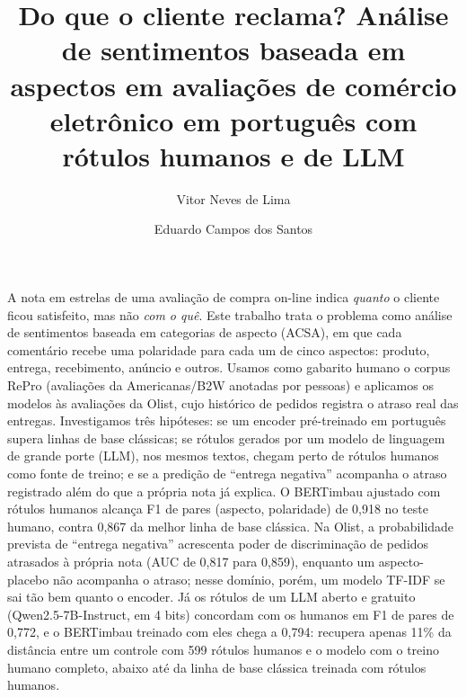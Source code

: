 \documentclass[a4paper, twocolumn, 11pt, twoside]{article}
\title{Do que o cliente reclama? Análise de sentimentos baseada em aspectos em avaliações de comércio eletrônico em português com rótulos humanos e de LLM}
\author{
  Vitor Neves de Lima
  \instituto{Ibmec BH}
  \email{vineveslima11@gmail.com}
  \and
  Eduardo Campos dos Santos \meuorcid{0000-0001-7361-3009}
  \instituto{Ibmec BH}
  \email{edu.campos.santos@gmail.com}
}
\begin{document}
\maketitle

\begin{resumo}
A nota em estrelas de uma avaliação de compra on-line indica \emph{quanto} o cliente ficou satisfeito, mas não \emph{com o quê}. Este trabalho trata o problema como análise de sentimentos baseada em categorias de aspecto (ACSA), em que cada comentário recebe uma polaridade para cada um de cinco aspectos: produto, entrega, recebimento, anúncio e outros. Usamos como gabarito humano o corpus RePro (avaliações da Americanas/B2W anotadas por pessoas) e aplicamos os modelos às avaliações da Olist, cujo histórico de pedidos registra o atraso real das entregas. Investigamos três hipóteses: se um encoder pré-treinado em português supera linhas de base clássicas; se rótulos gerados por um modelo de linguagem de grande porte (LLM), nos mesmos textos, chegam perto de rótulos humanos como fonte de treino; e se a predição de ``entrega negativa'' acompanha o atraso registrado além do que a própria nota já explica. O BERTimbau ajustado com rótulos humanos alcança F1 de pares (aspecto, polaridade) de 0,918 no teste humano, contra 0,867 da melhor linha de base clássica. Na Olist, a probabilidade prevista de ``entrega negativa'' acrescenta poder de discriminação de pedidos atrasados à própria nota (AUC de 0,817 para 0,859), enquanto um aspecto-placebo não acompanha o atraso; nesse domínio, porém, um modelo TF-IDF se sai tão bem quanto o encoder. Já os rótulos de um LLM aberto e gratuito (Qwen2.5-7B-Instruct, em 4 bits) concordam com os humanos em F1 de pares de 0,772, e o BERTimbau treinado com eles chega a 0,794: recupera apenas 11\% da distância entre um controle com 599 rótulos humanos e o modelo com o treino humano completo, abaixo até da linha de base clássica treinada com rótulos humanos.
\end{resumo}

\end{document}
